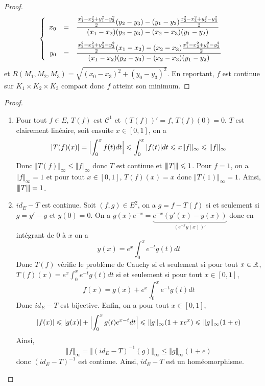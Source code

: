 \begin{proof}
\begin{equation}
	\left\{
		\begin{array}[]{rcl}
			x_{0} &= & \dfrac{\frac{x_{1}^{2}-x_{2}^{2}+y_{1}^{2}-y_{2}^{2}}{2}(y_{2}-y_{3})-(y_{1}-y_{2})\frac{x_{2}^{2}-x_{3}^{2}+y_{2}^{2}-y_{3}^{2}}{2}}{(x_{1}-x_{2})(y_{2}-y_{3})-(x_{2}-x_{3})(y_{1}-y_{2})}\\[0.5cm]
			y_{0} &= & \dfrac{\frac{x_{2}^{2}-x_{3}^{2}+y_{2}^{2}-y_{3}^{2}}{2}(x_{1}-x_{2})-(x_{2}-x_{3})\frac{x_{1}^{2}-x_{2}^{2}+y_{1}^{2}-y_{2}^{2}}{2}}{(x_{1}-x_{2})(y_{2}-y_{3})-(x_{2}-x_{3})(y_{1}-y_{2})}
		\end{array}	
	\right.
	\end{equation}
	et $R(M_{1},M_{2},M_{3})=\sqrt{(x_{0}-x_{3})^{2}+(y_{0}-y_{3})^{2}}$. En reportant, $f$ est continue sur $K_{1}\times K_{2}\times K_{3}$ compact donc $f$ atteint son minimum.
\end{proof}

\begin{proof}
	\phantom{}
	\begin{enumerate}
		\item Pour tout $f\in E$, $T(f)$ est $\mathcal{C}^{1}$ et $(T(f))'=f$, $T(f)(0)=0$. $T$ est clairement linéaire, soit ensuite $x\in[0,1]$, on a 
		\begin{equation}\vert T(f)(x)\vert=\Bigl\lvert\int_{0}^{x}f(t)dt\Bigr\rvert\leqslant\int_{0}^{x}\vert f(t)\vert dt\leqslant x\Vert f\Vert_{\infty}\leqslant\Vert f\Vert_{\infty}\end{equation}
		Donc $\Vert T(f)\Vert_{\infty}\leqslant\Vert f\Vert_{\infty}$ donc $T$ est continue et ${\left\vert\kern-0.25ex\left\vert\kern-0.25ex\left\vert{}T \right\vert\kern-0.25ex\right\vert\kern-0.25ex\right\vert}\leqslant1$. Pour $f=1$, on a $\Vert f\Vert_{\infty}=1$ et pour tout $x\in[0,1]$, $T(f)(x)=x$ donc $\Vert T(1)\Vert_{\infty}=1$. Ainsi, ${\left\vert\kern-0.25ex\left\vert\kern-0.25ex\left\vert{}T \right\vert\kern-0.25ex\right\vert\kern-0.25ex\right\vert}=1$.

		\item $id_{E}-T$ est continue. Soit $(f,g)\in E^{2}$, on a $g=f-T(f)$ si et seulement si $g=y'-y$ et $y(0)=0$. 
		On a $g(x)e^{-x}=\underbrace{e^{-x}(y'(x)-y(x))}_{(e^{-x}y(x))'}$ donc en intégrant de 0 à $x$ on a 
		\begin{equation}y(x)=e^{x}\int_{0}^{x}e^{-t}g(t)dt\end{equation}
		Donc $T(f)$ vérifie le problème de Cauchy si et seulement si pour tout $x\in\mathbb{R}$, $T(f)(x)=e^{x}\int_{0}^{x}e^{-t}g(t)dt$ si et seulement si pour tout $x\in[0,1]$, 
		\begin{equation}f(x)=g(x)+e^{x}\int_{0}^{x}e^{-t}g(t)dt\end{equation}
		Donc $id_{E}-T$ est bijective. 
		Enfin, on a pour tout $x\in[0,1]$, 
		\begin{equation}\vert f(x)\vert\leqslant\vert g(x)\vert+\Bigl\lvert\int_{0}^{x}g(t)e^{x-t}dt\Bigr\rvert\leqslant\Vert g\Vert_{\infty}(1+xe^{x})\leqslant\Vert g\Vert_{\infty}(1+e)\end{equation}
		Ainsi, 
		\begin{equation}\Vert f\Vert_{\infty}=\Vert(id_{E}-T)^{-1}(g)\Vert_{\infty}\leqslant\Vert g\Vert_{\infty}(1+e)\end{equation}
		donc $(id_{E}-T)^{-1}$ est continue. Ainsi, $id_{E}-T$ est un homéomorphisme.
	\end{enumerate}
\end{proof}


